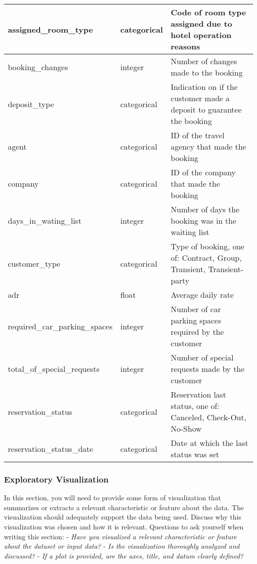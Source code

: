 \documentclass[
]{article}
\begin{document}
\begin{table}
\begin{tabular}[t]{l|l|l}
\hline
assigned\_room\_type & categorical & Code of room type assigned due to hotel operation reasons\\
\hline
booking\_changes & integer & Number of changes made to the booking\\
\hline
deposit\_type & categorical & Indication on if the customer made a deposit to guarantee the booking\\
\hline
agent & categorical & ID of the travel agency that made the booking\\
\hline
company & categorical & ID of the company that made the booking\\
\hline
days\_in\_wating\_list & integer & Number of days the booking was in the waiting list\\
\hline
customer\_type & categorical & Type of booking, one of: Contract, Group, Transient, Transient-party\\
\hline
adr & float & Average daily rate\\
\hline
required\_car\_parking\_spaces & integer & Number of car parking spaces required by the customer\\
\hline
total\_of\_special\_requests & integer & Number of special requests made by the customer\\
\hline
reservation\_status & categorical & Reservation last status, one of: Canceled, Check-Out, No-Show\\
\hline
reservation\_status\_date & categorical & Date at which the last status was set\\
\hline
\end{tabular}
\end{table}

\hypertarget{exploratory-visualization}{%
\subsubsection{Exploratory
Visualization}\label{exploratory-visualization}}

In this section, you will need to provide some form of visualization
that summarizes or extracts a relevant characteristic or feature about
the data. The visualization should adequately support the data being
used. Discuss why this visualization was chosen and how it is relevant.
Questions to ask yourself when writing this section: - \emph{Have you
visualized a relevant characteristic or feature about the dataset or
input data?} - \emph{Is the visualization thoroughly analyzed and
discussed?} - \emph{If a plot is provided, are the axes, title, and
datum clearly defined?}
\end{document}
